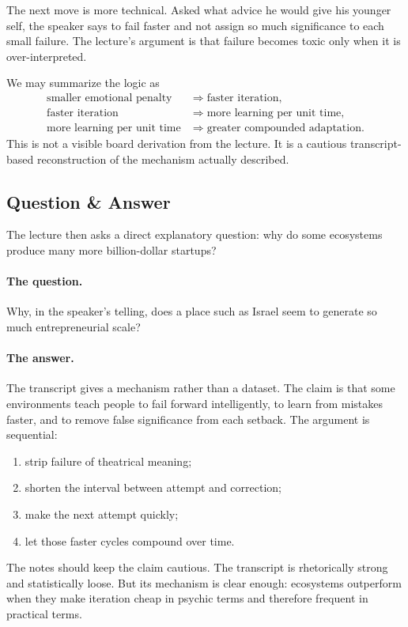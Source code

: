 The next move is more technical. Asked what advice he would give his younger self, the speaker says to fail faster and not assign so much significance to each small failure. The lecture's argument is that failure becomes toxic only when it is over-interpreted.

We may summarize the logic as
\begin{align}
\text{smaller emotional penalty} &\Rightarrow \text{faster iteration},\\
\text{faster iteration} &\Rightarrow \text{more learning per unit time},\\
\text{more learning per unit time} &\Rightarrow \text{greater compounded adaptation}.
\end{align}
This is not a visible board derivation from the lecture. It is a cautious transcript-based reconstruction of the mechanism actually described.

\subsection{Question \& Answer}

The lecture then asks a direct explanatory question: why do some ecosystems produce many more billion-dollar startups?

\paragraph{The question.}
Why, in the speaker's telling, does a place such as Israel seem to generate so much entrepreneurial scale?

\paragraph{The answer.}
The transcript gives a mechanism rather than a dataset. The claim is that some environments teach people to fail forward intelligently, to learn from mistakes faster, and to remove false significance from each setback. The argument is sequential:
\begin{enumerate}
\item strip failure of theatrical meaning;
\item shorten the interval between attempt and correction;
\item make the next attempt quickly;
\item let those faster cycles compound over time.
\end{enumerate}

The notes should keep the claim cautious. The transcript is rhetorically strong and statistically loose. But its mechanism is clear enough: ecosystems outperform when they make iteration cheap in psychic terms and therefore frequent in practical terms.

